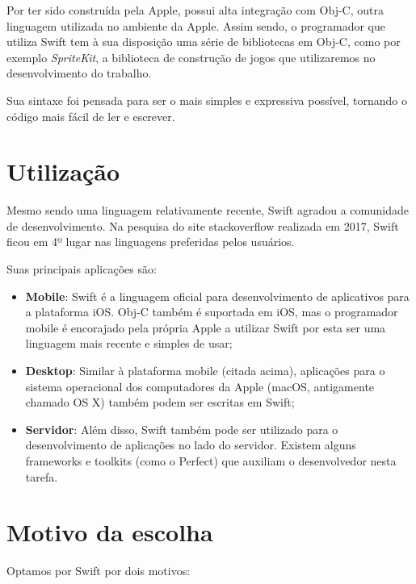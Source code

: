 \documentclass[rel_mlp]{iiufrgs}
\begin{document}
Por ter sido construída pela Apple, possui alta integração com Obj-C, outra linguagem utilizada no ambiente da Apple. Assim sendo, o programador que utiliza Swift tem à sua disposição uma série de bibliotecas em Obj-C, como por exemplo \textit{SpriteKit}, a biblioteca de construção de jogos que utilizaremos no desenvolvimento do trabalho.

Sua sintaxe foi pensada para ser o mais simples e expressiva possível, tornando o código mais fácil de ler e escrever. \cite{why_learn_swift}


\section{Utilização}

Mesmo sendo uma linguagem relativamente recente, Swift agradou a comunidade de desenvolvimento. Na pesquisa do site stackoverflow realizada em 2017, Swift ficou em 4º lugar nas linguagens preferidas pelos usuários.

Suas principais aplicações são:

\begin{itemize}[leftmargin=3em] %
\setlength{\itemindent}{1em}

    \item \textbf{Mobile}: Swift é a linguagem oficial para desenvolvimento de aplicativos para a plataforma iOS. Obj-C também é suportada em iOS, mas o programador mobile é encorajado pela própria Apple a utilizar Swift por esta ser uma linguagem mais recente e simples de usar;

    \item \textbf{Desktop}: Similar à plataforma mobile (citada acima), aplicações para o sistema operacional dos computadores da Apple (macOS, antigamente chamado OS X) também podem ser escritas em Swift;

    \item \textbf{Servidor}: Além disso, Swift também pode ser utilizado para o desenvolvimento de aplicações no lado do servidor. Existem alguns frameworks e toolkits (como o Perfect) que auxiliam o desenvolvedor nesta tarefa.

\end{itemize}

\section{Motivo da escolha}

Optamos por Swift por dois motivos:
\end{document}
